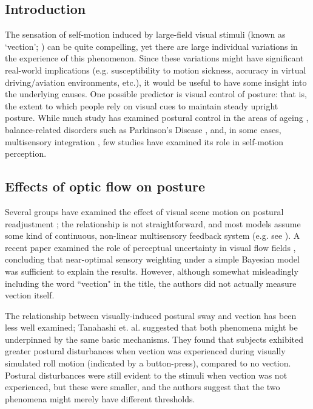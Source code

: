\documentclass[11pt]{article}
\begin{document}
\begin{linenumbers}
\section*{Introduction}
The sensation of self-motion induced by large-field visual stimuli (known as `vection'; \cite{Lishman:1973ck,Berthoz:1975hm}) can be quite compelling, yet there are large individual variations in the experience of this phenomenon. %
Since these variations might have significant real-world implications (e.g. susceptibility to motion sickness, accuracy in virtual driving/aviation environments, etc.), it would be useful to have some insight into the underlying causes. One possible predictor is visual control of posture: that is, the extent to which people rely on visual cues to maintain steady upright posture. While much study has examined postural control in the areas of ageing \cite{Ramdani:2013da, Jeka:2006fb}, balance-related disorders such as Parkinson's Disease \cite{Mitchell:1995vx,Schmit:2006bc}, and, in some cases, multisensory integration \cite{Maurer:2006ju, Peterka:2002vf, Peterka:2004ir}, few studies have examined its role in self-motion perception.

\subsection*{Effects of optic flow on posture}

Several groups have examined the effect of visual scene motion on postural readjustment \cite{Masson:1995eb, Lestienne:1977wn, Palmisano:2009uc}; the relationship is not straightforward, and most models assume some kind of continuous, non-linear multisensory feedback system  (e.g. see \cite{Creath:2005ey,Maurer:2005dy}). A recent paper examined the role of perceptual uncertainty in visual flow fields \cite{Wei:2010df}, concluding that near-optimal sensory weighting under a simple Bayesian model \cite{Alais:2004wt,Ernst:2002cc} was sufficient to explain the results. However, although somewhat misleadingly including the word ``vection" in the title, the authors did not actually measure vection itself. 

The relationship between visually-induced postural sway and vection has been less well examined; Tanahashi et. al. \cite{Tanahashi:2007hf} suggested that both phenomena might be underpinned by the same basic mechanisms. They found that subjects exhibited greater postural disturbances when vection was experienced during visually simulated roll motion (indicated by a button-press), compared to no vection. Postural disturbances were still evident to the stimuli when vection was not experienced, but these were smaller, and the authors suggest that the two phenomena might merely have different thresholds.  


\end{linenumbers}
\end{document}
